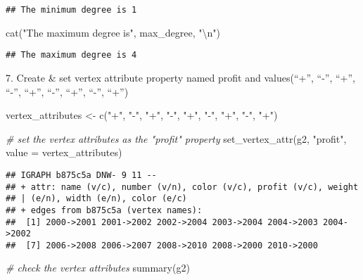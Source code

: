 \documentclass[
]{article}
\newenvironment{Shaded}{\begin{snugshade}}{\end{snugshade}}
\newcommand{\AttributeTok}[1]{\textcolor[rgb]{0.77,0.63,0.00}{#1}}
\newcommand{\CommentTok}[1]{\textcolor[rgb]{0.56,0.35,0.01}{\textit{#1}}}
\newcommand{\FunctionTok}[1]{\textcolor[rgb]{0.00,0.00,0.00}{#1}}
\newcommand{\NormalTok}[1]{#1}
\newcommand{\OtherTok}[1]{\textcolor[rgb]{0.56,0.35,0.01}{#1}}
\newcommand{\SpecialCharTok}[1]{\textcolor[rgb]{0.00,0.00,0.00}{#1}}
\newcommand{\StringTok}[1]{\textcolor[rgb]{0.31,0.60,0.02}{#1}}
\begin{document}
\begin{verbatim}
## The minimum degree is 1
\end{verbatim}

\begin{Shaded}
\begin{Highlighting}[]
\FunctionTok{cat}\NormalTok{(}\StringTok{"The maximum degree is"}\NormalTok{, max\_degree, }\StringTok{"}\SpecialCharTok{\textbackslash{}n}\StringTok{"}\NormalTok{)}
\end{Highlighting}
\end{Shaded}

\begin{verbatim}
## The maximum degree is 4
\end{verbatim}

7. Create \& set vertex attribute property named profit and
values(``+'', ``-'', ``+'', ``-'', ``+'', ``-'', ``+'', ``-'', ``+'')

\begin{Shaded}
\begin{Highlighting}[]
\NormalTok{vertex\_attributes }\OtherTok{\textless{}{-}} \FunctionTok{c}\NormalTok{(}\StringTok{"+"}\NormalTok{, }\StringTok{"{-}"}\NormalTok{, }\StringTok{"+"}\NormalTok{, }\StringTok{"{-}"}\NormalTok{, }\StringTok{"+"}\NormalTok{, }\StringTok{"{-}"}\NormalTok{, }\StringTok{"+"}\NormalTok{, }\StringTok{"{-}"}\NormalTok{, }\StringTok{"+"}\NormalTok{)}

\CommentTok{\# set the vertex attributes as the "profit" property}
\FunctionTok{set\_vertex\_attr}\NormalTok{(g2, }\StringTok{"profit"}\NormalTok{, }\AttributeTok{value =}\NormalTok{ vertex\_attributes)}
\end{Highlighting}
\end{Shaded}

\begin{verbatim}
## IGRAPH b875c5a DNW- 9 11 -- 
## + attr: name (v/c), number (v/n), color (v/c), profit (v/c), weight
## | (e/n), width (e/n), color (e/c)
## + edges from b875c5a (vertex names):
##  [1] 2000->2001 2001->2002 2002->2004 2003->2004 2004->2003 2004->2002
##  [7] 2006->2008 2006->2007 2008->2010 2008->2000 2010->2000
\end{verbatim}

\begin{Shaded}
\begin{Highlighting}[]
\CommentTok{\# check the vertex attributes}
\FunctionTok{summary}\NormalTok{(g2)}
\end{Highlighting}
\end{Shaded}
\end{document}
